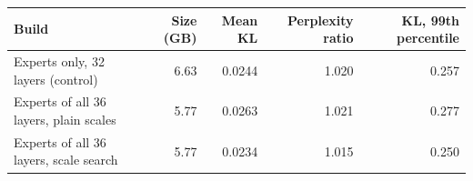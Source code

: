 \begin{tabular}{@{}lrrrr@{}}
\toprule
Build & Size (GB) & Mean KL & Perplexity ratio & KL, 99th percentile \\
\midrule
Experts only, 32 layers (control) & 6.63 & 0.0244 & 1.020 & 0.257 \\
Experts of all 36 layers, plain scales & 5.77 & 0.0263 & 1.021 & 0.277 \\
Experts of all 36 layers, scale search & 5.77 & 0.0234 & 1.015 & 0.250 \\
\bottomrule
\end{tabular}
